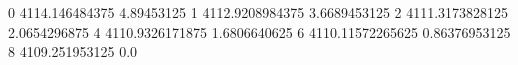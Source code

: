 0 4114.146484375 4.89453125
1 4112.9208984375 3.6689453125
2 4111.3173828125 2.0654296875
4 4110.9326171875 1.6806640625
6 4110.11572265625 0.86376953125
8 4109.251953125 0.0
